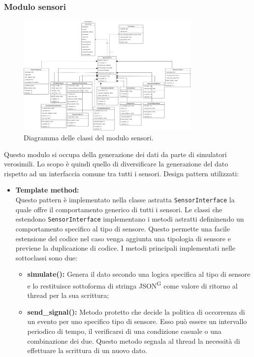 \documentclass[8pt]{article}
\newcommand{\glossterm}[1]{#1\textsuperscript{G}} %
\begin{document}
\subsubsection{Modulo sensori}
\begin{figure}[h!]
    \centering
    \includegraphics[width=0.8\textwidth]{images_st/sensors.png}
    \caption{Diagramma delle classi del modulo sensori.}
    \label{fig:Diagramma delle classi del modulo sensori}
\end{figure}
Questo modulo si occupa della generazione dei dati da parte di simulatori verosimili. Lo scopo è quindi quello di diversificare la generazione del dato rispetto ad un interfaccia comune tra tutti i sensori.
Design pattern utilizzati: 
\begin{itemize}
    \item \textbf{Template method:} 
    \\Questo pattern è implementato nella classe astratta \verb|SensorInterface| la quale offre il comportamento generico di tutti i sensori. Le classi che estendono \verb|SensorInterface| implementano i metodi astratti defininendo un comportamento specifico al tipo di sensore.
    Questo permette una facile estensione del codice nel caso venga aggiunta una tipologia di sensore e previene la duplicazione di codice. I metodi principali implementati nelle sottoclassi sono due:
    \begin{itemize}
        \item \textbf{simulate():} Genera il dato secondo una logica specifica al tipo di sensore e lo restituisce sottoforma di stringa \glossterm{JSON} come valore di ritorno al thread per la sua scrittura;
        \item \textbf{send\_signal():} Metodo protetto che decide la politica di occorrenza di un evento per uno specifico tipo di sensore. Esso può essere un intervallo periodico di tempo, il verificarsi di una condizione casuale o una combinazione dei due. Questo metodo segnala al thread la necessità di effettuare la scrittura di un nuovo dato. 
    \end{itemize}
\end{itemize}
\end{document}
